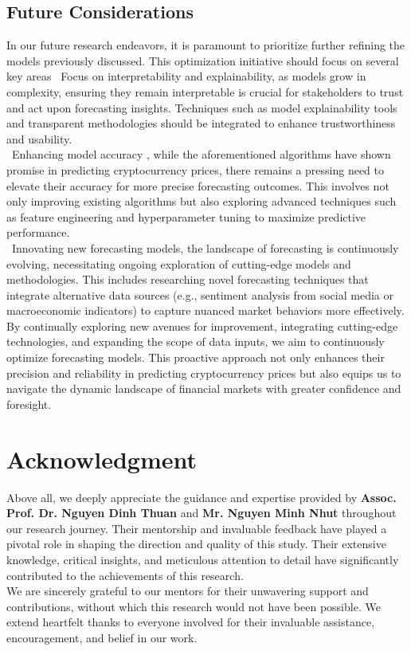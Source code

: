 \documentclass{ieeeojies}
\begin{document}
\subsection{Future Considerations}
In our future research endeavors, it is paramount to prioritize further refining the models previously discussed. This optimization initiative should focus on several key areas
\indent\textbullet\ Focus on interpretability and explainability, as models grow in complexity, ensuring they remain interpretable is crucial for stakeholders to trust and act upon forecasting insights. Techniques such as model explainability tools and transparent methodologies should be integrated to enhance trustworthiness and usability.\\
\indent\textbullet\ Enhancing model accuracy , while the aforementioned algorithms have shown promise in predicting cryptocurrency prices, there remains a pressing need to elevate their accuracy for more precise forecasting outcomes. This involves not only improving existing algorithms but also exploring advanced techniques such as feature engineering and hyperparameter tuning to maximize predictive performance.\\
\indent\textbullet\ Innovating new forecasting models, the landscape of forecasting is continuously evolving, necessitating ongoing exploration of cutting-edge models and methodologies. This includes researching novel forecasting techniques that integrate alternative data sources (e.g., sentiment analysis from social media or macroeconomic indicators) to capture nuanced market behaviors more effectively. \\
By continually exploring new avenues for improvement, integrating cutting-edge technologies, and expanding the scope of data inputs, we aim to continuously optimize forecasting models. This proactive approach not only enhances their precision and reliability in predicting cryptocurrency prices but also equips us to navigate the dynamic landscape of financial markets with greater confidence and foresight.
\section*{Acknowledgment}
Above all, we deeply appreciate the guidance and expertise provided by \textbf{Assoc. Prof. Dr. Nguyen Dinh Thuan} and \textbf{Mr. Nguyen Minh Nhut} throughout our research journey. Their mentorship and invaluable feedback have played a pivotal role in shaping the direction and quality of this study. Their extensive knowledge, critical insights, and meticulous attention to detail have significantly contributed to the achievements of this research.
\\We are sincerely grateful to our mentors for their unwavering support and contributions, without which this research would not have been possible. We extend heartfelt thanks to everyone involved for their invaluable assistance, encouragement, and belief in our work.
\end{document}
